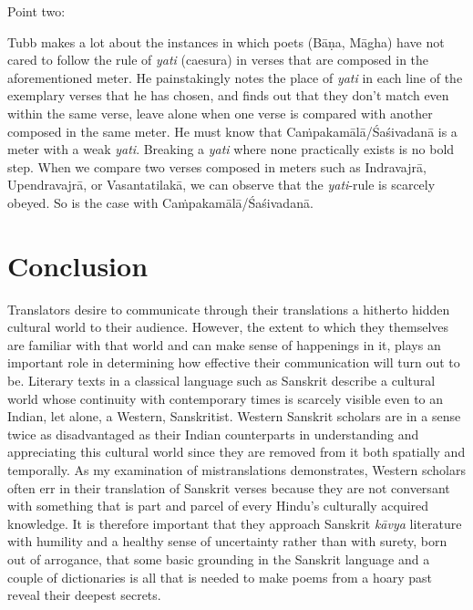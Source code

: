 Point two:

Tubb makes a lot about the instances in which poets (Bāṇa, Māgha) have not cared to follow the rule of \textsl{yati} (caesura) in verses that are composed in the aforementioned meter. He painstakingly notes the place of \textsl{yati} in each line of the exemplary verses that he has chosen, and finds out that they don’t match even within the same verse, leave alone when one verse is compared with another composed in the same meter. He must know that Caṁpakamālā/Śaśivadanā is a meter with a weak \textsl{yati}. Breaking a \textsl{yati} where none practically exists is no bold step. When we compare two verses composed in meters such as Indravajrā, Upendravajrā, or Vasantatilakā, we can observe that the \textsl{yati}-rule is scarcely obeyed. So is the case with Caṁpakamālā/Śaśivadanā.

\section*{Conclusion}

Translators desire to communicate through their translations a hitherto hidden cultural world to their audience. However, the extent to which they themselves are familiar with that world and can make sense of happenings in it, plays an important role in determining how effective their communication will turn out to be. Literary texts in a classical language such as Sanskrit describe a cultural world whose continuity with contemporary times is scarcely visible even to an Indian, let alone, a Western, Sanskritist. Western Sanskrit scholars are in a sense twice as disadvantaged as their Indian counterparts in understanding and appreciating this cultural world since they are removed from it both spatially and temporally. As my examination of mistranslations demonstrates, Western scholars often err in their translation of Sanskrit verses because they are not conversant with something that is part and parcel of every Hindu’s culturally acquired knowledge. It is therefore important that they approach Sanskrit \textsl{kāvya} literature with humility and a healthy sense of uncertainty rather than with surety, born out of arrogance, that some basic grounding in the Sanskrit language and a couple of dictionaries is all that is needed to make poems from a hoary past reveal their deepest secrets. 


